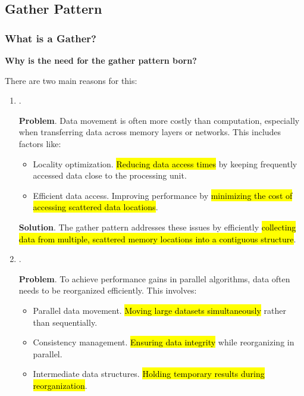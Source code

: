 \subsection{Gather Pattern}

\subsubsection{What is a Gather?}

\begin{flushleft}
    \textcolor{Green3}{ \textbf{Why is the need for the gather pattern born?}}
\end{flushleft}
There are two main reasons for this:
\begin{enumerate}
    \item {}.

    \textcolor{Red2}{ \textbf{Problem}}. Data movement is often more costly than computation, especially when transferring data across memory layers or networks. This includes factors like:
    \begin{itemize}
        \item Locality optimization. \hl{Reducing data access times} by keeping frequently accessed data close to the processing unit.
        \item Efficient data access. Improving performance by \hl{minimizing the cost of accessing scattered data locations}.
    \end{itemize}

    \textcolor{Green3}{ \textbf{Solution}}. The gather pattern addresses these issues by efficiently \hl{collecting data from multiple, scattered memory locations into a contiguous structure}.


    \item {}.
    
    \textcolor{Red2}{ \textbf{Problem}}. To achieve performance gains in parallel algorithms, data often needs to be reorganized efficiently. This involves:
    \begin{itemize}
        \item Parallel data movement. \hl{Moving large datasets simultaneously} rather than sequentially.
        \item Consistency management. \hl{Ensuring data integrity} while reorganizing in parallel.
        \item Intermediate data structures. \hl{Holding temporary results during reorganization}.
    \end{itemize}


\end{enumerate}
